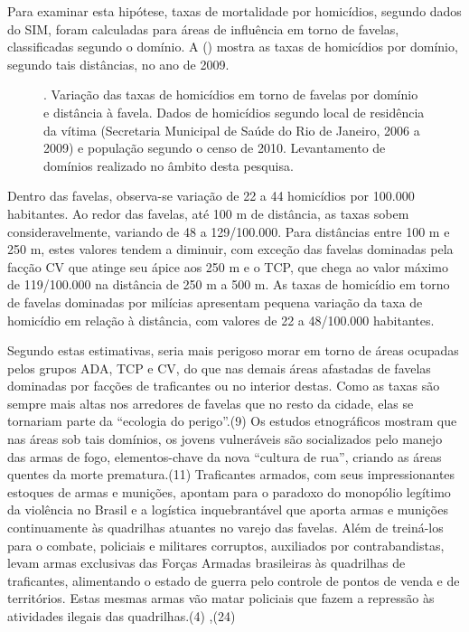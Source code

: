 \documentclass{article}
\begin{document}
Para examinar esta hipótese, taxas de mortalidade por homicídios, segundo dados
do SIM, foram calculadas para áreas de influência em torno de favelas,
classificadas segundo o domínio. A ()
mostra as taxas de homicídios por domínio, segundo tais distâncias, no ano de
2009.

\begin{figure}
\caption{. Variação das taxas de homicídios em torno de favelas por domínio e
distância à favela. Dados de homicídios segundo local de residência da vítima
(Secretaria Municipal de Saúde do Rio de Janeiro, 2006 a 2009) e população
segundo o censo de 2010. Levantamento de domínios realizado no âmbito desta
pesquisa.}
\end{figure}

Dentro das favelas, observa-se variação de 22 a 44 homicídios por 100.000
habitantes. Ao redor das favelas, até 100 m de distância, as taxas sobem
consideravelmente, variando de 48 a 129/100.000. Para distâncias entre 100 m e
250 m, estes valores tendem a diminuir, com exceção das favelas dominadas pela
facção CV que atinge seu ápice aos 250 m e o TCP, que chega ao valor máximo de
119/100.000 na distância de 250 m a 500 m. As taxas de homicídio em torno de
favelas dominadas por milícias apresentam pequena variação da taxa de homicídio
em relação à distância, com valores de 22 a 48/100.000 habitantes.

Segundo estas estimativas, seria mais perigoso morar em torno de áreas ocupadas
pelos grupos ADA, TCP e CV, do que nas demais áreas afastadas de favelas
dominadas por facções de traficantes ou no interior destas. Como as taxas são
sempre mais altas nos arredores de favelas que no resto da cidade, elas se
tornariam parte da “ecologia do perigo”.(9)
Os estudos etnográficos mostram que nas áreas sob tais domínios, os jovens
vulneráveis são socializados pelo manejo das armas de fogo, elementos-chave da
nova “cultura de rua”, criando as áreas quentes da morte prematura.(11)
Traficantes armados, com seus impressionantes estoques de armas e munições,
apontam para o paradoxo do monopólio legítimo da violência no Brasil e a
logística inquebrantável que aporta armas e munições continuamente às quadrilhas
atuantes no varejo das favelas. Além de treiná-los para o combate, policiais e
militares corruptos, auxiliados por contrabandistas, levam armas exclusivas das
Forças Armadas brasileiras às quadrilhas de traficantes, alimentando o estado de
guerra pelo controle de pontos de venda e de territórios. Estas mesmas armas vão
matar policiais que fazem a repressão às atividades ilegais das quadrilhas.(4)
,(24)
\end{document}

